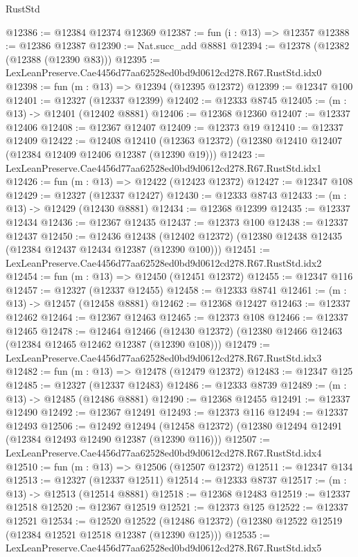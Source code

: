 \begin{lexlean}{RustStd}
\begin{coremodule}
@12386 := @12384 @12374 @12369
@12387 := fun (i : @13) => @12357
@12388 := @12386 @12387
@12390 := Nat.succ_add @8881
@12394 := @12378 (@12382 (@12388 (@12390 @83)))
@12395 := LexLeanPreserve.Cae4456d77aa62528ed0bd9d0612cd278.R67.RustStd.idx0
@12398 := fun (m : @13) => @12394 (@12395 @12372)
@12399 := @12347 @100
@12401 := @12327 (@12337 @12399)
@12402 := @12333 @8745
@12405 := (m : @13) -> @12401 (@12402 @8881)
@12406 := @12368 @12360
@12407 := @12337 @12406
@12408 := @12367 @12407
@12409 := @12373 @19
@12410 := @12337 @12409
@12422 := @12408
    @12410
    (@12363 @12372)
    (@12380 @12410 @12407 (@12384 @12409 @12406 @12387 (@12390 @19)))
@12423 := LexLeanPreserve.Cae4456d77aa62528ed0bd9d0612cd278.R67.RustStd.idx1
@12426 := fun (m : @13) => @12422 (@12423 @12372)
@12427 := @12347 @108
@12429 := @12327 (@12337 @12427)
@12430 := @12333 @8743
@12433 := (m : @13) -> @12429 (@12430 @8881)
@12434 := @12368 @12399
@12435 := @12337 @12434
@12436 := @12367 @12435
@12437 := @12373 @100
@12438 := @12337 @12437
@12450 := @12436
    @12438
    (@12402 @12372)
    (@12380 @12438 @12435 (@12384 @12437 @12434 @12387 (@12390 @100)))
@12451 := LexLeanPreserve.Cae4456d77aa62528ed0bd9d0612cd278.R67.RustStd.idx2
@12454 := fun (m : @13) => @12450 (@12451 @12372)
@12455 := @12347 @116
@12457 := @12327 (@12337 @12455)
@12458 := @12333 @8741
@12461 := (m : @13) -> @12457 (@12458 @8881)
@12462 := @12368 @12427
@12463 := @12337 @12462
@12464 := @12367 @12463
@12465 := @12373 @108
@12466 := @12337 @12465
@12478 := @12464
    @12466
    (@12430 @12372)
    (@12380 @12466 @12463 (@12384 @12465 @12462 @12387 (@12390 @108)))
@12479 := LexLeanPreserve.Cae4456d77aa62528ed0bd9d0612cd278.R67.RustStd.idx3
@12482 := fun (m : @13) => @12478 (@12479 @12372)
@12483 := @12347 @125
@12485 := @12327 (@12337 @12483)
@12486 := @12333 @8739
@12489 := (m : @13) -> @12485 (@12486 @8881)
@12490 := @12368 @12455
@12491 := @12337 @12490
@12492 := @12367 @12491
@12493 := @12373 @116
@12494 := @12337 @12493
@12506 := @12492
    @12494
    (@12458 @12372)
    (@12380 @12494 @12491 (@12384 @12493 @12490 @12387 (@12390 @116)))
@12507 := LexLeanPreserve.Cae4456d77aa62528ed0bd9d0612cd278.R67.RustStd.idx4
@12510 := fun (m : @13) => @12506 (@12507 @12372)
@12511 := @12347 @134
@12513 := @12327 (@12337 @12511)
@12514 := @12333 @8737
@12517 := (m : @13) -> @12513 (@12514 @8881)
@12518 := @12368 @12483
@12519 := @12337 @12518
@12520 := @12367 @12519
@12521 := @12373 @125
@12522 := @12337 @12521
@12534 := @12520
    @12522
    (@12486 @12372)
    (@12380 @12522 @12519 (@12384 @12521 @12518 @12387 (@12390 @125)))
@12535 := LexLeanPreserve.Cae4456d77aa62528ed0bd9d0612cd278.R67.RustStd.idx5

\end{coremodule}
\end{lexlean}
